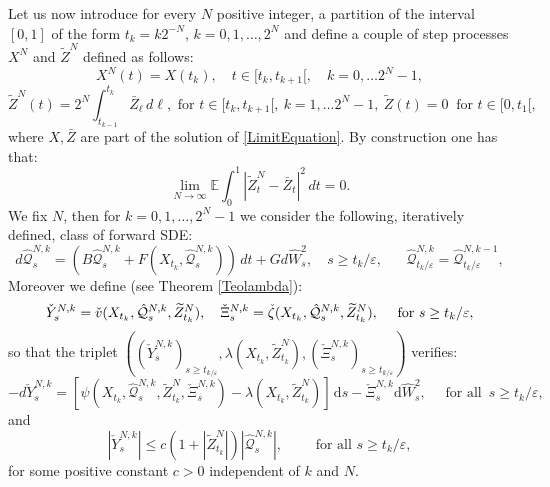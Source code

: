 \documentclass[reqno,a4paper,11 pt]{article}
\def \E {\mathbb{E}}
\def \e {\varepsilon}
\newcommand{\rmd}{\mathrm{d}}
\numberwithin{equation}{section}
\begin{document}
Let us now introduce for every $ N$ positive integer, a partition of the interval $[0,1]$ of the form $t_k= {k}{2^{- N}}, \, k=0,1, \dots, 2^N$ and define a couple of  step processes ${X}^N$ and $\widetilde{Z}^N$ defined as follows:
\begin{equation}\label{defXN}
{X}^N(t)= {X}( t_k),\quad {t} \in[t_k, t_{k+1}[, \quad k =0,\dots 2^N-1, \end{equation}
\begin{equation}\label{defZtilde}
\widetilde{Z}^N(t)= 2^{N} \int_{t_{k-1}}^{t_k}\bar{Z}_{\ell} \, d\ell,  \text{ for } t  \in[t_k, t_{k+1}[, \ k =1,\dots 2^N-1, \ \widetilde{Z}(t)= 0 \ \text{ for } t \in[0, t_{1}[,
\end{equation}
where $X, \bar{Z}$ are part of the solution of \eqref{LimitEquation}. By construction one has that:
\begin{equation}\label{RegBarZ}
\lim_{N \to \infty}\E \int_{0}^{1} |\widetilde{Z}^N_t-\bar{Z}_t|^2 \, dt =0.
\end{equation}
We fix $N$, then for  $ k=0,1, \dots ,2^{N}-1$ we consider the following, iteratively defined, class  of forward SDE:
\begin{equation} \label{quickN}
d{\hat{\mathcal{Q}}}^{N,k}_s=(B{\hat{\mathcal{Q}}}^{N,k}_s+ F({X}_{  t_k} ,{\hat{\mathcal{Q}}}^{N,k}_s))\,dt + G d\hat{W}^2_s, \quad s \geq t_k/\e,
\hspace{20pt} \hat{\mathcal{Q}}^{N,k}_{t_k/\e}={\hat{\mathcal{Q}}^{N,k-1}_{t_k/\e}},
\end{equation}
Moreover we define (see Theorem \ref{Teolambda}):
 $$\check{Y}^{N,k}_s=\check{v}(X_{t_k},\hat{\mathcal{Q}}^{N,k}_s, \widetilde{Z}^N_{t_k}), \quad 
 \check{\Xi}^{N,k}_s=\check{\zeta}(X_{t_k},\hat{\mathcal{Q}}^{N,k}_s, \widetilde{Z}^N_{t_k}), \quad \hbox{ for } s\geq t_k/\e ,$$
so that
the triplet $((\check{Y}^{N,k}_s)_{s\geq t_{k/\e}}, \lambda(X_{t_k},\widetilde{Z}^N_{t_k}), (\check{\Xi}^{N,k}_s)_{s\geq t_{k/\e}})$ verifies:
\begin{equation}
\label{BackInfHorStep}
- d \check{Y}^{N,k}_s=[\psi({X}_{t_k},\hat{\mathcal{Q}}^{N,k}_s,\widetilde{Z}^{N}_{t_k},\check{\Xi}^{N,k}_s)-\lambda({X}_{t_k},\widetilde{Z}^{N}_{ t_k})]\,\rmd s - \check{\Xi}^{N,k}_s \rmd \hat{W}_s^{2}, \quad  \text{ for all } \, s\geq t_{k}/\e,
\end{equation}
and
\begin{equation}\label{stimapathwise}
|\check{Y}^{N,k}_s|\leq c( 1 + |\widetilde{Z}^N_{t_k}|)
|\hat{\mathcal{Q}}_s^{N,k}|, \qquad \text{ for all } s  \geq t_k/\e, \end{equation}
for some positive constant $c>0$ independent of $k$ and $N$.
\end{document}
